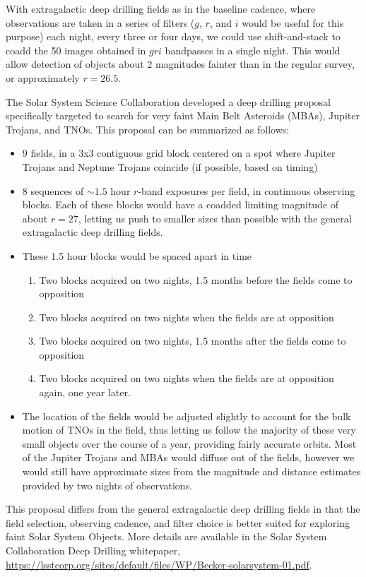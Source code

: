 With extragalactic deep drilling fields as in the baseline cadence,
where observations are taken in a series of filters ($g$, $r$, and $i$
would be useful for this purpose) each night, every three or four
days, we could use shift-and-stack to coadd the 50 images obtained in
$gri$ bandpasses in a single night. This would allow detection of
objects about 2 magnitudes fainter than in the regular survey, or
approximately $r=26.5$.

The Solar System Science Collaboration developed a deep drilling
proposal specifically targeted to search for very faint Main Belt
Asteroids (MBAs),  Jupiter Trojans,
and TNOs. This proposal can be summarized as
follows:
\begin{itemize}
\item 9 fields, in a 3x3 contiguous grid block centered on a spot
  where Jupiter Trojans and Neptune Trojans coincide (if possible,
  based on timing)
\item 8 sequences of $\sim1.5$ hour $r$-band exposures per field, in continuous
  observing blocks. Each of these blocks would have a coadded limiting
  magnitude of about $r=27$, letting us push to smaller sizes than
  possible with the general extragalactic deep drilling fields.
\item These 1.5 hour blocks would be spaced apart in time
   \begin{enumerate}
   \item Two blocks acquired on two nights, 1.5 months before the fields come to
     opposition
  \item  Two blocks acquired on two nights when the fields are at
    opposition
  \item Two blocks acquired on two nights, 1.5 months after the fields
    come to opposition
  \item Two blocks acquired on two nights when the fields are at
    opposition again, one year later. 
 \end{enumerate}
\item The location of the fields would be adjusted slightly to account
  for the bulk motion of TNOs in the field, thus letting us follow the
  majority of these very small objects over the course of a year,
  providing fairly accurate orbits. Most of the Jupiter Trojans and
  MBAs would diffuse out of the fields, however we would still have
  approximate sizes from the magnitude and distance estimates provided
  by two nights of observations. 
\end{itemize}

This proposal differs from the general extragalactic deep drilling
fields in that the field selection, observing cadence, and filter
choice is better suited for exploring faint Solar System Objects. More
details are available in the Solar System Collaboration Deep Drilling
whitepaper, \url{https://lsstcorp.org/sites/default/files/WP/Becker-solarsystem-01.pdf}.




\navigationbar
